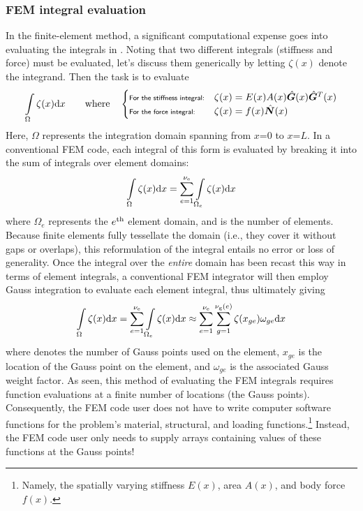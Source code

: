 \subsubsection{FEM integral evaluation}
In the finite-element method, a significant computational expense goes into evaluating the integrals in .  Noting that two different integrals (stiffness and force) must be evaluated, let's discuss them generically by letting $\zeta(x)$ denote the integrand. Then the task is to evaluate 
\begin{equation}
  \int\limits_\Omega \zeta(x) \mathrm{d} x
\qquad\text{where}\quad
\begin{cases}
\text{\scriptsize{\textsf{For the stiffness integral:}}}& \zeta(x)=E(x)A(x)\hat{\bm{G}}(x)\hat{\bm{G}}^T(x)\\
\text{\scriptsize{\textsf{For the force integral:}}}& \zeta(x)=f(x)\hat{\bm{N}}(x)\\
\end{cases}
\label{eq:LinearBarGenericIntegral}
\end{equation}
Here, $\Omega$ represents the integration domain spanning from $x$=$0$ to $x$=$L$. In a conventional FEM code, each integral of this form is evaluated by breaking it into the sum of integrals over element domains:
\begin{equation}
  \int\limits_\Omega \zeta(x) \mathrm{d} x = \sum\limits_{e=1}^{{\nu_\text{e}}}\int\limits_{\Omega_e} \zeta(x) \mathrm{d} x
\label{eq:LinearBarGenericIntegralBrokenIntoElements}
\end{equation}
where $\Omega_e$ represents the $e^\text{th}$ element domain, and \numelements is the number of elements. Because finite elements fully tessellate the domain (i.e., they cover it without gaps or overlaps), this reformulation of the integral entails no error or loss of generality.  Once the integral over the \emph{entire} domain has been recast this way in terms of element integrals, a conventional FEM integrator will then employ Gauss integration to evaluate each element integral, thus ultimately giving
\begin{equation}
  \int\limits_\Omega \zeta(x) \mathrm{d} x = \sum\limits_{e=1}^{{\nu_\text{e}}}\int\limits_{\Omega_e} \zeta(x) \mathrm{d} x \approx \sum\limits_{e=1}^{{\nu_\text{e}}}\sum\limits_{g=1}^{{\nu_\text{g}(e)}} \zeta(x_{ge}) \omega_{ge} \mathrm{d} x
\label{eq:oneDFEMstyleIntegration}
\end{equation}
where \numgaussOnElemente denotes the number of Gauss points used on the \eeth element, $x_{ge}$ is the location of the \gth Gauss point on the \eeth element, and $\omega_{ge}$ is the associated Gauss weight factor.  As seen, this method of evaluating the FEM integrals requires function evaluations at a finite number of locations (the Gauss points). Consequently, the FEM code user does not have to write computer software functions for the problem's material, structural, and loading functions.\footnote{Namely, the spatially varying stiffness $E(x)$, area $A(x)$, and body force $f(x)$.} Instead, the FEM code user only needs to supply arrays containing values of these functions at the Gauss points!  

